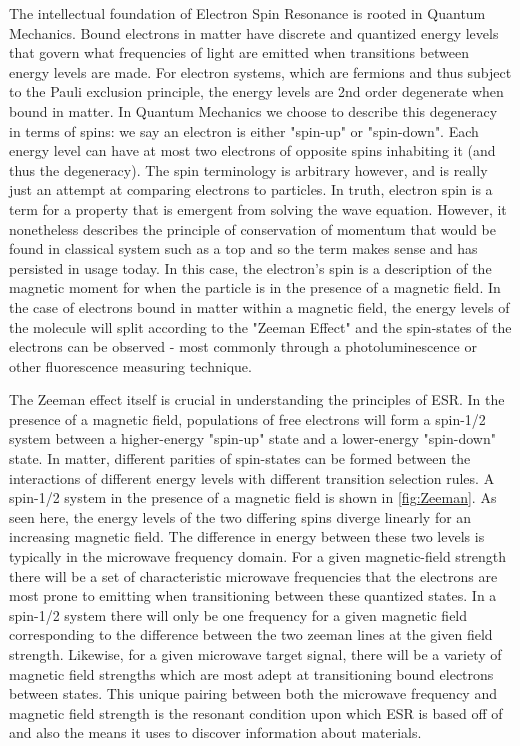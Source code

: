 \documentclass[oneside, astronomy, noacknowlegments]{BYUPhys}
\begin{document}
The intellectual foundation of Electron Spin Resonance is rooted in Quantum Mechanics. Bound electrons in matter have discrete and quantized energy levels that govern what frequencies of light are emitted when transitions between energy levels are made. For electron systems, which are fermions and thus subject to the Pauli exclusion principle, the energy levels are 2nd order degenerate when bound in matter. In Quantum Mechanics we choose to describe this degeneracy in terms of spins: we say an electron is either "spin-up" or "spin-down". Each energy level can have at most two electrons of opposite spins inhabiting it (and thus the degeneracy). The spin terminology is arbitrary however, and is really just an attempt at comparing electrons to particles. In truth, electron spin is a term for a property that is emergent from solving the wave equation. However, it nonetheless describes the principle of conservation of momentum that would be found in classical system such as a top and so the term makes sense and has persisted in usage today. In this case, the electron's spin is a description of the magnetic moment for when the particle is in the presence of a magnetic field. In the case of electrons bound in matter within a magnetic field, the energy levels of the molecule will split according to the "Zeeman Effect" and the spin-states of the electrons can be observed - most commonly through a photoluminescence or other fluorescence measuring technique.

The Zeeman effect itself is crucial in understanding the principles of ESR. In the presence of a magnetic field, populations of free electrons will form a spin-1/2 system between a higher-energy "spin-up" state and a lower-energy "spin-down" state. In matter, different parities of spin-states can be formed between the interactions of different energy levels with different transition selection rules. A spin-1/2 system in the presence of a magnetic field is shown in \ref{fig:Zeeman}. As seen here, the energy levels of the two differing spins diverge linearly for an increasing magnetic field. The difference in energy between these two levels is typically in the microwave frequency domain. For a given magnetic-field strength there will be a set of characteristic microwave frequencies that the electrons are most prone to emitting when transitioning between these quantized states. In a spin-1/2 system there will only be one frequency for a given magnetic field corresponding to the difference between the two zeeman lines at the given field strength. Likewise, for a given microwave target signal, there will be a variety of magnetic field strengths which are most adept at transitioning bound electrons between states. This unique pairing between both the microwave frequency and magnetic field strength is the resonant condition upon which ESR is based off of and also the means it uses to discover information about materials.
\end{document}
